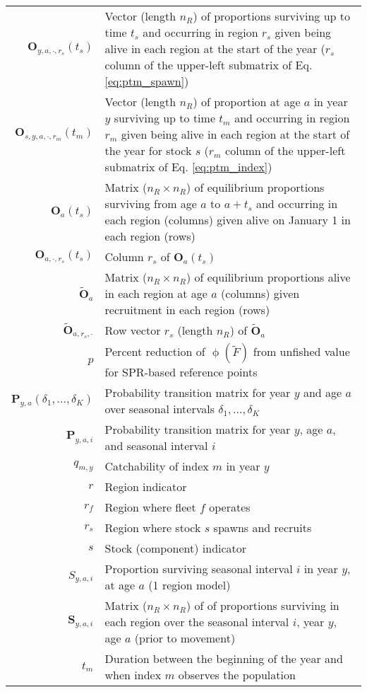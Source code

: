 \begin{longtable}[c]{r p{}}
$\mathbf{O}_{y,a,\cdot,r_s}(t_s)$ & Vector (length $n_R$) of proportions surviving up to time $t_s$ and occurring in region $r_s$ given being alive in each region at the start of the year ($r_s$ column of the upper-left submatrix of Eq. \ref{eq:ptm_spawn})\\
$\mathbf{O}_{s,y,a,\cdot,r_m}(t_m)$ & Vector (length $n_R$) of proportion at age $a$ in year $y$ surviving up to time $t_m$ and occurring in region $r_m$ given being alive in each region at the start of the year for stock $s$ ($r_m$ column of the upper-left submatrix of Eq. \ref{eq:ptm_index})\\
$\mathbf{O}_{a}(t_s)$ & Matrix ($n_R \times n_R$) of equilibrium proportions surviving from age $a$ to $a+t_s$ and occurring in each region (columns) given alive on January 1 in each region (rows)\\
$\mathbf{O}_{a,\cdot,r_s}(t_s)$ & Column $r_s$ of $\mathbf{O}_{a}(t_s)$\\
$\widetilde{\mathbf{O}}_{a}$ & Matrix ($n_R \times n_R$) of equilibrium proportions alive in each region at age $a$ (columns) given recruitment in each region (rows)\\
$\widetilde{\mathbf{O}}_{a,r_s,\cdot}$ & Row vector $r_s$ (length $n_R$) of $\widetilde{\mathbf{O}}_{a}$\\
$p$ & Percent reduction of $\upphi(\widetilde{F})$ from unfished value for SPR-based reference points\\ 
$\mathbf{P}_{y,a}(\delta_1,\ldots,\delta_K)$ & Probability transition matrix for year $y$ and age $a$ over seasonal intervals $\delta_1,\ldots, \delta_K$\\
$\mathbf{P}_{y,a,i}$ & Probability transition matrix for year $y$, age $a$, and seasonal interval $i$\\
$q_{m,y}$ & Catchability of index $m$ in year $y$\\
$r$ & Region indicator\\
$r_f$ & Region where fleet $f$ operates\\
$r_s$ & Region where stock $s$ spawns and recruits\\
$s$ & Stock (component) indicator\\
$S_{y,a,i}$ & Proportion surviving seasonal interval $i$ in year $y$, at age $a$ (1 region model)\\
$\mathbf{S}_{y,a,i}$ & Matrix ($n_R \times n_R$) of of proportions surviving in each region over the seasonal interval $i$, year $y$, age $a$ (prior to movement)\\
$t_m$ & Duration between the beginning of the year and when index $m$ observes the population\\

\end{longtable}
